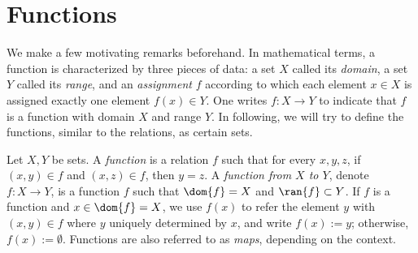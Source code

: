 \section{Functions}
\begin{comment}
\begin{definition}[Functions]
    Let $X, Y$ be sets, and let $P(x, y)$ be a property pertaining to an object $x \in X$ and an object $y \in Y$, such that for every $x \in X$, there is exactly one $y \in Y$ for which $P(x, y)$ is true. Then we define the \emph{function $f : X \to Y$ defined by $P$ on the domain $X$ and range $Y$} to be the object which, given any input $x \in X$, assigns an output $f(x) \in Y$, defined to be the unique object $f(x)$ for which $P(x, f(x))$ is true. Thus for any $x \in X$ and $y \in Y$,
    \begin{align*}
        y = f(x) \Longleftrightarrow P(x, y) \text{ is true}.
    \end{align*}
\end{definition}
\end{comment}

We make a few motivating remarks beforehand. In mathematical terms, a function is characterized by three pieces of data: a set $X$ called its \emph{domain}, a set $Y$ called its \emph{range}, and an \emph{assignment} $f$ according to which each element $x \in X$ is assigned exactly one element $f(x) \in Y$. One writes $f : X \to Y$ to indicate that $f$ is a function with domain $X$ and range $Y$. In following, we will try to define the functions, similar to the relations, as certain sets.

\begin{definition}[Functions]
    Let $X, Y$ be sets. A \emph{function} is a relation $f$ such that for every $x, y, z $, if $(x, y) \in f$ and $(x, z) \in f$, then $y = z$. A \emph{function from $X$ to $Y$}, denote $f : X \to Y$, is a function $f$ such that $\dom{f} = X$ and $\ran{f} \subset Y$. If $f$ is a function and $x \in \dom{f} = X$, we use $f(x)$ to refer the element $y$ with $(x, y) \in f$ where $y$ uniquely determined by $x$, and write $f(x) := y$; otherwise, $f(x) := \emptyset$. Functions are also referred to as \emph{maps}, depending on the context.
\end{definition}

\begin{comment}
\begin{definition}[Functions]
    Let $X, Y$ be sets. A \emph{function from $X$ to $Y$} is a relation $f$ such that $\dom{f} = X$ and that for each $x \in X$ there is a unique $f(x) := y \in Y$ such that $(x, y) \in f$. In other words, for each $x \in X$, if $(x, y) \in f$ and $(x, z) \in f$, then $y = z$. If $f$ is a function from $X$ to $Y$, we write $f : X \to Y$. Functions are also referred to as \emph{maps}, depending on the context.
\end{definition}
\end{comment}

